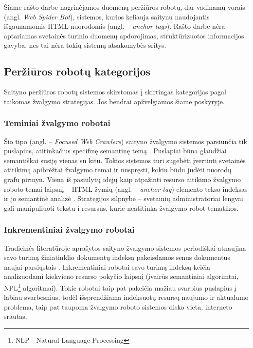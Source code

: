 

Šiame rašto darbe nagrinėjamos duomenų peržiūros robotų, dar vadinamų vorais (angl. \textit{Web Spider Bot}), sistemos, kurios keliauja saitynu naudojantis išgaunamomis HTML nuorodomis (angl. -- \textit{anchor tags}). Rašto darbe nėra aptariamas svetainės turinio duomenų apdorojimas, struktūrizuotos informacijos gavyba, nes tai nėra tokių sistemų atsakomybės sritys.



\subsection{Peržiūros robotų kategorijos}

Saityno peržiūros robotų sistemos skirstomas į skirtingas kategorijas pagal taikomas žvalgymo strategijas. Jos bendrai apžvelgiamos šiame poskyryje.

\subsubsection{Teminiai žvalgymo robotai}

Šio tipo (angl. -- \textit{Focused Web Crawlers}) saityno žvalgymo sistemos parsiunčia tik puslapius, atitinkačius specifinę semantinę temą \cite{CategoriesOfWebCrawlersAndOverview}. Puslapiai būna glaudžiai semantiškai susiję vienas su kitu. Tokios sistemos turi sugebėti įvertinti svetainės atitikimą apibrėžtai žvalgymo temai ir nuspręsti, kokiu būdu judėti nuorodų grafu pirmyn. Viena iš pasiūlytų idėjų kaip atpažinti resurso aitikimo žvalgymo roboto temai laipsnį -- HTML žymių (angl. -- \textit{anchor tag}) elemento tekso indeksas ir jo semantinė analizė \cite{AnchorTagsSemanticAnalysis}. Strategijos silpnybė -- svetainių administratoriai lengvai gali manipuliuoti tekstu į resursus, kurie neatitinka žvalgymo robot tematikos.


\subsubsection{Inkrementiniai žvalgymo robotai}

Tradicinės literatūroje aprašytos saityno žvalgymo sistemos periodiškai atnaujina savo turimą žiniatinklio dokumentų indeksą pakeisdamos senus dokumentus naujai parsiųstais \cite{CategoriesOfWebCrawlersAndOverview}. Inkrementiniai robotai savo turimą indeksą keičia analizuodami kiekvieno resurso pokyčio laipsnį (įvairūs semantiniai algorimtai, NPL\footnote{NLP - Natural Language Processing} algoritmai). Tokie robotai taip pat pakeičia mažiau svarbius puslapius į labiau svarbesnius, todėl išsprendžiama indeksuotų resursų naujumo ir aktualumo problema, taip pat taupoma žvalgymo roboto sistemos disko vieta, interneto srautas.

